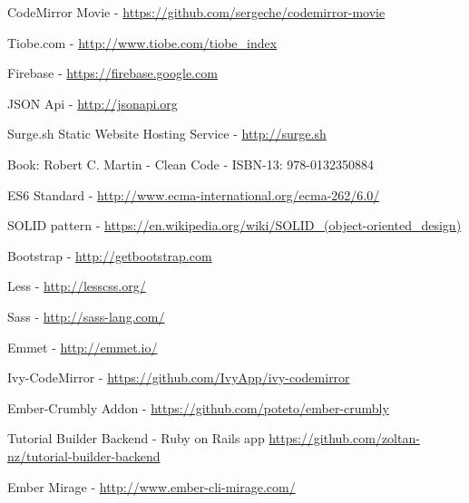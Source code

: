 \documentclass[11pt, a4paper, oneside, openright, medskipamount]{report}
\begin{document}

\backmatter




\begin{thebibliography}{9}

CodeMirror Movie - \url{https://github.com/sergeche/codemirror-movie}

Tiobe.com - \url{http://www.tiobe.com/tiobe_index}

Firebase - \url{https://firebase.google.com}

JSON Api - \url{http://jsonapi.org}

Surge.sh Static Website Hosting Service - \url{http://surge.sh}

Book: Robert C. Martin - Clean Code - ISBN-13: 978-0132350884

ES6 Standard - \url{http://www.ecma-international.org/ecma-262/6.0/}

SOLID pattern - \url{https://en.wikipedia.org/wiki/SOLID_(object-oriented_design)}

Bootstrap - \url{http://getbootstrap.com}

Less - \url{http://lesscss.org/}

Sass - \url{http://sass-lang.com/}

Emmet - \url{http://emmet.io/}

Ivy-CodeMirror - \url{https://github.com/IvyApp/ivy-codemirror}

Ember-Crumbly Addon - \url{https://github.com/poteto/ember-crumbly}

Tutorial Builder Backend - Ruby on Rails app \url{https://github.com/zoltan-nz/tutorial-builder-backend}

Ember Mirage - \url{http://www.ember-cli-mirage.com/}

\end{thebibliography}

\end{document}
